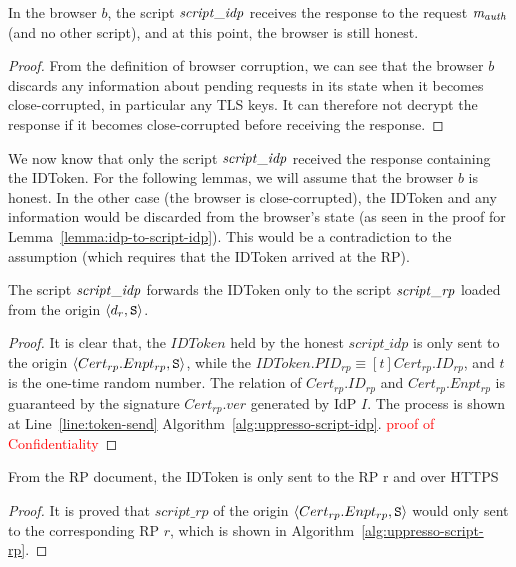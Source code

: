   
  \begin{lemma} \label{lemma:idp-to-script-idp} %
    In the browser $b$, the script $\mathit{script\_idp}$ receives the response to the request $\mathit{m_{auth}}$ (and no other script), and at this point, the browser is still honest.
  \end{lemma}
  \begin{proof}
    From the definition of browser corruption, we can see that the browser $b$ discards any information about pending requests in its state when it becomes close-corrupted, in particular any TLS keys. It can therefore not decrypt the response if it becomes close-corrupted before receiving the response.
  \end{proof}
  
  We now know that only the script $\mathit{script\_idp}$ received 
  the response containing the IDToken. For the following lemmas, 
  we will assume that the browser $b$ is honest. In the other 
  case (the browser is close-corrupted), the IDToken and any 
  information would be discarded from the browser's state 
  (as seen in the proof for Lemma~\ref{lemma:idp-to-script-idp}). 
  This would be a contradiction to the assumption 
  (which requires that the IDToken arrived at the RP).
  
  
  \begin{lemma}\label{lemma:script-idp-to-script-rp} %
    The script $\mathit{script\_idp}$ forwards the IDToken only to 
    the script $\mathit{script\_rp}$ loaded from the origin 
    $\langle d_r, \mathtt{S}\rangle$.
  \end{lemma}
  \begin{proof}
    It is clear that, the $IDToken$ held by the honest 
    $script\_idp$ is only sent to the origin 
    $\langle Cert_{rp}.Enpt_{rp}, \mathtt{S}\rangle$, 
    while the $IDToken.PID_{rp} \equiv [t]Cert_{rp}.ID_{rp}$, 
    and $t$ is the one-time random number. The relation of 
    $Cert_{rp}.ID_{rp}$ and $Cert_{rp}.Enpt_{rp}$ is guaranteed 
    by the signature $Cert_{rp}.ver$ generated by IdP $I$. 
    The process is shown at Line~\ref{line:token-send}
    Algorithm~\ref{alg:uppresso-script-idp}.
    \textcolor{red}{proof of Confidentiality}
  \end{proof}
  
  \begin{lemma}\label{lemma:script-rp-to-rp} %
    From the RP document, the IDToken is only sent to the RP r 
    and over HTTPS
  \end{lemma}
  \begin{proof}
    It is proved that $script\_rp$ of the origin 
    $\langle Cert_{rp}.Enpt_{rp}, \mathtt{S}\rangle$ 
    would only sent to the corresponding RP $r$, 
    which is shown in Algorithm~\ref{alg:uppresso-script-rp}.
  \end{proof}
  

